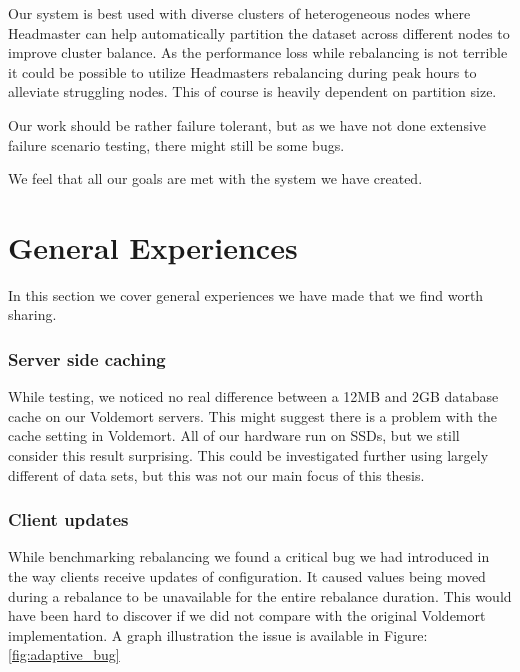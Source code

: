 Our system is best used with diverse clusters of heterogeneous nodes where Headmaster can help automatically partition the dataset across different nodes to improve cluster balance. As the performance loss while rebalancing is not terrible it could be possible to utilize Headmasters rebalancing during peak hours to alleviate struggling nodes. This of course is heavily dependent on partition size. 

Our work should be rather failure tolerant, but as we have not done extensive failure scenario testing, there might still be some bugs. 

We feel that all our goals are met with the system we have created.

\section{General Experiences}
In this section we cover general experiences we have made that we find worth sharing. 
\label{eval:exp}

\subsubsection{Server side caching}
While testing, we noticed no real difference between a 12MB and 2GB database cache on our Voldemort servers. This might suggest there is a problem with the cache setting in Voldemort. All of our hardware run on SSDs, but we still consider this result surprising. This could be investigated further using largely different of data sets, but this was not our main focus of this thesis.

\subsubsection{Client updates}
While benchmarking rebalancing we found a critical bug we had introduced in the way clients receive updates of configuration. It caused values being moved during a rebalance to be unavailable for the entire rebalance duration. This would have been hard to discover if we did not compare with the original Voldemort implementation. A graph illustration the issue is available in Figure: \ref{fig:adaptive_bug}


